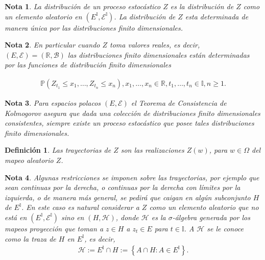 \documentclass{article}
\newtheorem{Def}{Definición}[section]
\newtheorem{Note}{Nota}[section]
\newcommand{\prob}{\mathbb{P}}
\numberwithin{equation}{section}
\begin{document}
\begin{Note}
La distribuci\'on de un proceso estoc\'astico $Z$ es la distribuci\'on de $Z$ como un elemento aleatorio en $\left(E^{\mathbb{I}},\mathcal{E}^{\mathbb{I}}\right)$. La distribuci\'on de $Z$ esta determinada de manera \'unica por las distribuciones finito dimensionales.
\end{Note}

\begin{Note}
En particular cuando $Z$ toma valores reales, es decir, $\left(E,\mathcal{E}\right)=\left(\mathbb{R},\mathcal{B}\right)$ las distribuciones finito dimensionales est\'an determinadas por las funciones de distribuci\'on finito dimensionales

\begin{eqnarray}
\prob\left(Z_{t_{1}}\leq x_{1},\ldots,Z_{t_{n}}\leq x_{n}\right),x_{1},\ldots,x_{n}\in\mathbb{R},t_{1},\ldots,t_{n}\in\mathbb{I},n\geq1.
\end{eqnarray}
\end{Note}

\begin{Note}
Para espacios polacos $\left(E,\mathcal{E}\right)$ el Teorema de Consistencia de Kolmogorov asegura que dada una colecci\'on de distribuciones finito dimensionales consistentes, siempre existe un proceso estoc\'astico que posee tales distribuciones finito dimensionales.
\end{Note}


\begin{Def}
Las trayectorias de $Z$ son las realizaciones $Z\left(w\right)$, para $w\in\Omega$ del mapeo aleatorio $Z$.
\end{Def}

\begin{Note}
Algunas restricciones se imponen sobre las trayectorias, por ejemplo que sean continuas por la derecha, o continuas por la derecha con l\'imites por la izquierda, o de manera m\'as general, se pedir\'a que caigan en alg\'un subconjunto $H$ de $E^{\mathbb{I}}$. En este caso es natural considerar a $Z$ como un elemento aleatorio que no est\'a en $\left(E^{\mathbb{I}},\mathcal{E}^{\mathbb{I}}\right)$ sino en $\left(H,\mathcal{H}\right)$, donde $\mathcal{H}$ es la $\sigma$-\'algebra generada por los mapeos proyecci\'on que toman a $z\in H$ a $z_{t}\in E$ para $t\in\mathbb{I}$. A $\mathcal{H}$ se le conoce como la traza de $H$ en $E^{\mathbb{I}}$, es decir,
\begin{eqnarray}
\mathcal{H}:=E^{\mathbb{I}}\cap H:=\left\{A\cap H:A\in E^{\mathbb{I}}\right\}.
\end{eqnarray}
\end{Note}
\end{document}
